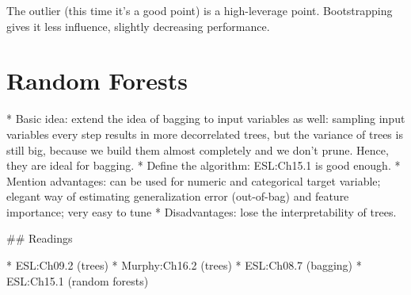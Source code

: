\begin{example}
The outlier (this time it's a good point) is a high-leverage point. Bootstrapping gives it less influence, slightly decreasing performance.

\end{example}

\section{Random Forests}



* Basic idea: extend the idea of bagging to input variables as well: sampling input variables every step results in more decorrelated trees, but the variance of trees is still big, because we build them almost completely and we don't prune. Hence, they are ideal for bagging.
* Define the algorithm: ESL:Ch15.1 is good enough.
* Mention advantages: can be used for numeric and categorical target variable; elegant way of estimating generalization error (out-of-bag) and feature importance; very easy to tune
* Disadvantages: lose the interpretability of trees.

## Readings


* ESL:Ch09.2 (trees)
* Murphy:Ch16.2 (trees)
* ESL:Ch08.7 (bagging)
* ESL:Ch15.1 (random forests)